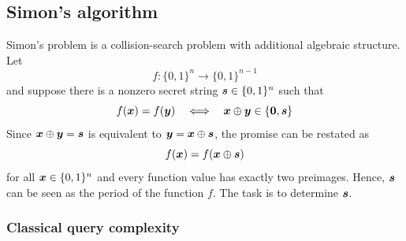 \subsection{Simon's algorithm}\label{sec:simons-algorithm}

Simon's problem is a collision-search problem with additional algebraic structure.
Let
\[
f:\{0,1\}^n\to\{0,1\}^{n-1}
\]
and suppose there is a nonzero secret string
\(
{\boldsymbol{s}}\in\{0,1\}^n
\)
such that
\begin{equation}\label{eq:simon-promise}
f({\boldsymbol{x}})=f({\boldsymbol{y}})
\quad\Longleftrightarrow\quad
{\boldsymbol{x}}\oplus{\boldsymbol{y}}\in\{{\boldsymbol{0}},{\boldsymbol{s}}\}
\end{equation}
Since \({\boldsymbol{x}}\oplus{\boldsymbol{y}}={\boldsymbol{s}}\) is equivalent to \({\boldsymbol{y}}={\boldsymbol{x}}\oplus{\boldsymbol{s}}\), 
the promise can be restated as
\[
f({\boldsymbol{x}})
=
f({\boldsymbol{x}}\oplus{\boldsymbol{s}})
\]
for all \({\boldsymbol{x}} \in\{0,1\}^n\) and every function value has exactly two preimages.
Hence, ${\boldsymbol{s}}$ can be seen as the period of the function \(f\).
The task is to determine \({\boldsymbol{s}}\).



\subsubsection*{Classical query complexity}




